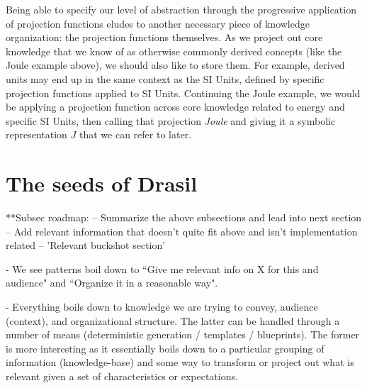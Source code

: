 Being able to specify our level of abstraction through the progressive 
application of projection functions eludes to another necessary piece of 
knowledge organization: the projection functions themselves. As we project out 
core knowledge that we know of as otherwise commonly derived concepts (like the 
Joule example above), we should also like to store them. For example, derived 
units may end up in the same context as the SI Units, defined by specific 
projection functions applied to SI Units. Continuing the Joule example, we 
would be applying a projection function across core knowledge related to energy 
and specific SI Units, then calling that projection \emph{Joule} and giving it 
a symbolic representation $J$ that we can refer to later.

  
\section{The seeds of Drasil}
  **Subsec roadmap:
    -- Summarize the above subsections and lead into next section
    -- Add relevant information that doesn't quite fit above 
      and isn't implementation related
    -- 'Relevant buckshot section'

- We see patterns boil down to ``Give me relevant info on X for this \sf{} and 
audience" and ``Organize it in a reasonable way".

- Everything boils down to knowledge we are trying to convey, audience 
(context), and organizational structure. The latter can be 
handled through a number of means (deterministic generation / templates / 
blueprints). The former is more interesting as it essentially boils down to a 
particular grouping of information (knowledge-base) and some way to transform 
or project out what is relevant given a set of characteristics or expectations.